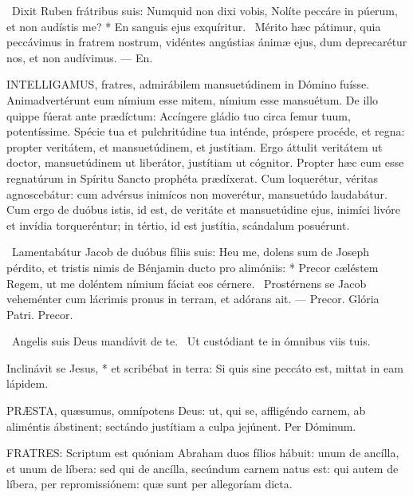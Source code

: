 \R\ Dixit Ruben frátribus suis: Numquid non dixi vobis, Nolíte peccáre in púerum, et non audístis me? * En sanguis ejus exquíritur. \V\ Mérito hæc pátimur, quia peccávimus in fratrem nostrum, vidéntes angústias ánimæ ejus, dum deprecarétur nos, et non audívimus. --- En.


\lettrine[lines=2]{I}{NTELLIGAMUS}, fratres, admirábilem mansuetúdinem in Dómino fuísse. Animadvertérunt eum nímium esse mitem, nímium esse mansuétum. De illo quippe fúerat ante prædíctum: Accíngere gládio tuo circa femur tuum, potentíssime. Spécie tua et pulchritúdine tua inténde, próspere procéde, et regna: propter veritátem, et mansuetúdinem, et justítiam. Ergo áttulit veritátem ut doctor, mansuetúdinem ut liberátor, justítiam ut cógnitor. Propter hæc eum esse regnatúrum in Spíritu Sancto prophéta prædíxerat. Cum loquerétur, véritas agnoscebátur: cum advérsus inimícos non moverétur, mansuetúdo laudabátur. Cum ergo de duóbus istis, id est, de veritáte et mansuetúdine ejus, inimíci livóre et invídia torqueréntur; in tértio, id est justítia, scándalum posuérunt.

\R\ Lamentabátur Jacob de duóbus fíliis suis: Heu me, dolens sum de Joseph pérdito, et tristis nimis de Bénjamin ducto pro alimóniis: * Precor cæléstem Regem, ut me doléntem nímium fáciat eos cérnere. \V\ Prostérnens se Jacob veheménter cum lácrimis pronus in terram, et adórans ait. --- Precor. Glória Patri. Precor.

\V\ Angelis suis Deus mandávit de te. \R\ Ut custódiant te in ómnibus viis tuis.

 Inclinávit se Jesus, * et scribébat in terra: Si quis sine peccáto est, mittat in eam lápidem.


\lettrine[lines=2]{P}{RÆSTA}, quæsumus, omnípotens Deus: ut, qui se, affligéndo carnem, ab aliméntis ábstinent; sectándo justítiam a culpa jejúnent. Per Dóminum.




\lettrine[lines=2]{F}{RATRES}: Scriptum est quóniam Abraham duos fílios hábuit: unum de ancílla, et unum de líbera: sed qui de ancílla, secúndum carnem natus est: qui autem de líbera, per repromissiónem: quæ sunt per allegoríam dicta.

